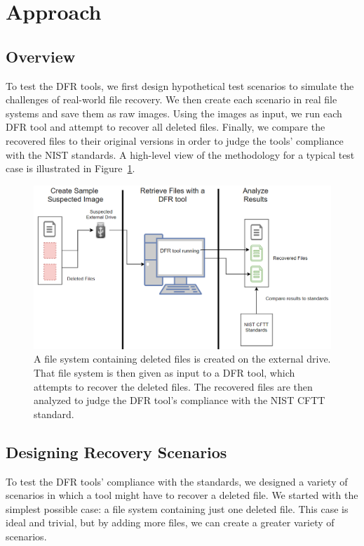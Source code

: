 \section{Approach}

\subsection{Overview}

To test the DFR tools, we first design hypothetical test scenarios to simulate the challenges of real-world file recovery.
We then create each scenario in real file systems and save them as raw images. 
Using the images as input, we run each DFR tool and attempt to recover all deleted files. 
Finally, we compare the recovered files to their original versions in order to judge the tools' 
compliance with the NIST standards. A high-level view of the methodology for a typical test case is illustrated in Figure~\ref{fig:overview}.

\begin{figure}[h]
    \centering
    \includegraphics[width=\linewidth]{fig/overview.png}
    \caption{A file system containing deleted files is created on the external drive. That file system is then given as input to a DFR tool, which attempts to recover the deleted files. The recovered files are then analyzed to judge the DFR tool's compliance with the NIST CFTT standard.}
    \label{fig:overview}
\end{figure}

\subsection{Designing Recovery Scenarios}
To test the DFR tools' compliance with the standards, we designed a variety of scenarios in which a tool might have to recover a deleted file. 
We started with the simplest possible case: a file system containing just one deleted file. 
This case is ideal and trivial, but by adding more files, we can create a greater variety of scenarios.

